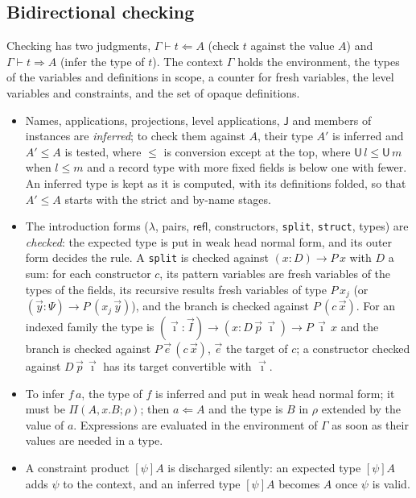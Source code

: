 \documentclass[11pt]{article}
\newcommand{\kw}[1]{\texttt{#1}}
\newcommand{\U}{\mathsf{U}}
\theoremstyle{remark}
\begin{document}
\subsection{Bidirectional checking}

Checking has two judgments, $\Gamma\vdash t\Leftarrow A$ (check $t$
against the value $A$) and $\Gamma\vdash t\Rightarrow A$ (infer the type
of $t$). The context $\Gamma$ holds the environment, the types of the
variables and definitions in scope, a counter for fresh variables, the
level variables and constraints, and the set of opaque definitions.
\begin{itemize}
\item Names, applications, projections, level applications, $\mathsf J$
  and members of instances are \emph{inferred}; to check them against
  $A$, their type $A'$ is inferred and $A'\le A$ is tested, where $\le$
  is conversion except at the top, where $\U\,l\le\U\,m$ when $l\le m$
  and a record type with more fixed fields is below one with fewer.
  An inferred type is kept as it is computed, with its definitions
  folded, so that $A'\le A$ starts with the strict and by-name stages.
\item The introduction forms ($\lambda$, pairs, $\mathsf{refl}$,
  constructors, \kw{split}, \kw{struct}, types) are \emph{checked}: the
  expected type is put in weak head normal form, and its outer form
  decides the rule. A \kw{split} is checked against $(x:D)\to P\,x$ with
  $D$ a sum: for each constructor $c$, its pattern variables are fresh
  variables of the types of the fields, its recursive results fresh
  variables of type $P\,x_j$ (or $(\vec y:\Psi)\to P\,(x_j\,\vec y)$), and
  the branch is checked against $P\,(c\,\vec x)$. For an indexed family
  the type is $(\vec\imath:\vec I)\to(x:D\,\vec p\,\vec\imath)\to
  P\,\vec\imath\,x$ and the branch is checked against
  $P\,\vec e\,(c\,\vec x)$, $\vec e$ the target of $c$; a constructor
  checked against $D\,\vec p\,\vec\imath$ has its target convertible
  with $\vec\imath$.
\item To infer $f\,a$, the type of $f$ is inferred and put in weak head
  normal form; it must be $\Pi(A,x.B;\rho)$; then $a\Leftarrow A$ and the
  type is $B$ in $\rho$ extended by the value of $a$. Expressions are
  evaluated in the environment of $\Gamma$ as soon as their values are
  needed in a type.
\item A constraint product $[\psi]A$ is discharged silently: an expected
  type $[\psi]A$ adds $\psi$ to the context, and an inferred type
  $[\psi]A$ becomes $A$ once $\psi$ is valid.
\end{itemize}
\end{document}
